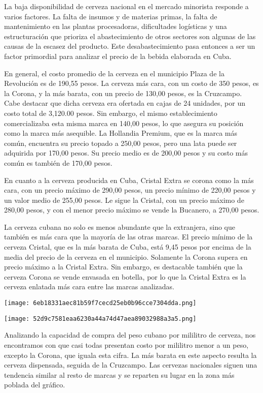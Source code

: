 La baja disponibilidad de cerveza nacional en el mercado minorista
responde a varios factores. La falta de insumos y de materias primas, la
falta de mantenimiento en las plantas procesadoras, dificultades
logísticas y una estructuración que prioriza el abastecimiento de otros
sectores son algunas de las causas de la escasez del producto. Este
desabastecimiento pasa entonces a ser un factor primordial para analizar
el precio de la bebida elaborada en Cuba.

En general, el costo promedio de la cerveza en el municipio Plaza de la
Revolución es de 190,55 pesos. La cerveza más cara, con un costo de 350
pesos, es la Corona, y la más barata, con un precio de 130,00 pesos, es
la Cruzcampo. Cabe destacar que dicha cerveza era ofertada en cajas de
24 unidades, por un costo total de 3,120.00 pesos. Sin embargo, el mismo
establecimiento comercializaba esta misma marca en 140,00 pesos, lo que
asegura su posición como la marca más asequible. La Hollandia Premium,
que es la marca más común, encuentra su precio topado a 250,00 pesos,
pero una lata puede ser adquirida por 170,00 pesos. Su precio medio es
de 200,00 pesos y su costo más común es también de 170,00 pesos.

En cuanto a la cerveza producida en Cuba, Cristal Extra se corona como
la más cara, con un precio máximo de 290,00 pesos, un precio mínimo de
220,00 pesos y un valor medio de 255,00 pesos. Le sigue la Cristal, con
un precio máximo de 280,00 pesos, y con el menor precio máximo se vende
la Bucanero, a 270,00 pesos.

La cerveza cubana no solo es menos abundante que la extranjera, sino que
también es más cara que la mayoría de las otras marcas. El precio mínimo
de la cerveza Cristal, que es la más barata de Cuba, está 9,45 pesos por
encima de la media del precio de la cerveza en el municipio. Solamente
la Corona supera en precio máximo a la Cristal Extra. Sin embargo, es
destacable también que la cerveza Corona se vende envasada en botella,
por lo que la Cristal Extra es la cerveza enlatada más cara entre las
marcas analizadas.


\texttt{[image: 6eb18331aec81b59f7cecd25eb0b96cce7304dda.png]}

\texttt{[image: 52d9c7581eaa6230a44a74d47aea89032988a3a5.png]}

Analizando la capacidad de compra del peso cubano por mililitro de
cerveza, nos encontramos con que casi todas presentan costo por
mililitro menor a un peso, excepto la Corona, que iguala esta cifra. La
más barata en este aspecto resulta la cerveza dispensada, seguida de la
Cruzcampo. Las cervezas nacionales siguen una tendencia similar al resto
de marcas y se reparten su lugar en la zona más poblada del gráfico.



